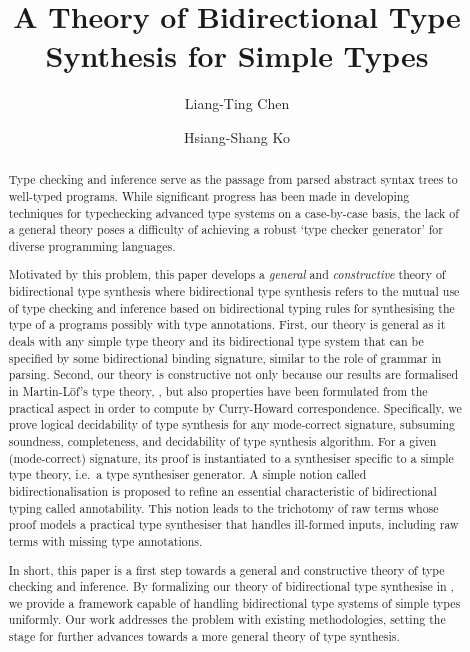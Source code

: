 \documentclass[acmsmall,screen]{acmart}
\theoremstyle{acmdefinition}
\begin{document}
\author{Liang-Ting Chen}
\author{Hsiang-Shang Ko}


\title{A Theory of Bidirectional Type Synthesis for Simple Types}

\begin{abstract}
  Type checking and inference serve as the passage from parsed abstract syntax trees to well-typed programs.
  While significant progress has been made in developing techniques for typechecking advanced type systems on a case-by-case basis, the lack of a general theory poses a difficulty of achieving a robust `type checker generator' for diverse programming languages.

  Motivated by this problem, this paper develops a \emph{general} and \emph{constructive} theory of bidirectional type synthesis where bidirectional type synthesis refers to the mutual use of type checking and inference based on bidirectional typing rules for synthesising the type of a programs possibly with type annotations.
  First, our theory is general as it deals with any simple type theory and its bidirectional type system that can be specified by some bidirectional binding signature, similar to the role of grammar in parsing.
  Second, our theory is constructive not only because our results are formalised in Martin-L\"{o}f's type theory, \Agda, but also properties have been formulated from the practical aspect in order to compute by Curry-Howard correspondence.
  Specifically, we prove logical decidability of type synthesis for any mode-correct signature, subsuming soundness, completeness, and decidability of type synthesis algorithm.
  For a given (mode-correct) signature, its proof is instantiated to a synthesiser specific to a simple type theory, i.e.\ a type synthesiser generator.
  A simple notion called bidirectionalisation is proposed to refine an essential characteristic of bidirectional typing called annotability.
  This notion leads to the trichotomy of raw terms whose proof models a practical type synthesiser that handles ill-formed inputs, including raw terms with missing type annotations.

  In short, this paper is a first step towards a general and constructive theory of type checking and inference.
  By formalizing our theory of bidirectional type synthesise in \Agda, we provide a framework capable of handling bidirectional type systems of simple types uniformly.
  Our work addresses the problem with existing methodologies, setting the stage for further advances towards a more general theory of type synthesis.
\end{abstract}
\end{document}

